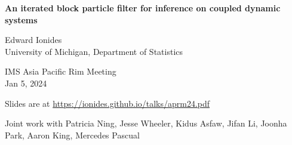 \documentclass{beamer}
\begin{document}
\begin{frame}
  
\begin{center}
  {\Large\bf An iterated block particle filter for inference on coupled dynamic systems}



\vspace{2mm}

Edward Ionides\\
University of Michigan, Department of Statistics

\vspace{8mm}

IMS Asia Pacific Rim Meeting\\
Jan 5, 2024


\hspace{3mm}

Slides are at \url{https://ionides.github.io/talks/aprm24.pdf}

\vspace{8mm}

Joint work with
Patricia Ning, Jesse Wheeler, Kidus Asfaw, Jifan Li, Joonha Park, Aaron King, Mercedes Pascual

\end{center}

\end{frame}
\end{document}
